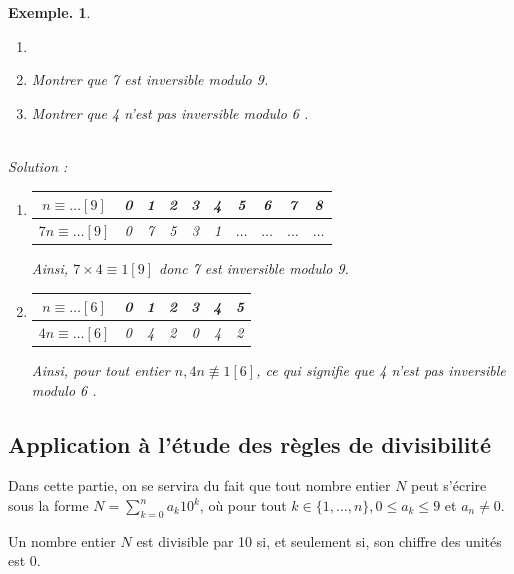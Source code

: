 \documentclass[12pt]{article}
\newcommand{\hide}[1]{#1}
\theoremstyle{break}
\newtheorem*{example}{Exemple.}
\begin{document}
\begin{example}
\begin{enumerate}[noitemsep,topsep=0pt]
    \item[]
    \item Montrer que 7 est inversible modulo 9.
    \item Montrer que 4 n'est pas inversible modulo 6 .
\end{enumerate}
\noindent
~\\Solution :
\begin{enumerate}[noitemsep,topsep=0pt]
    \item
    \begin{tabular}{|c|c|c|c|c|c|c|c|c|c|}
    \hline
    $n \equiv \ldots[9]$ & 0 & 1 & 2 & 3 & 4 & 5 & 6 & 7 & 8 \\
    \hline
    $7 n \equiv \ldots[9]$ & 0 & 7 & 5 & 3 & 1 & $\ldots$ & $\ldots$ & $\ldots$ & $\ldots$ \\
    \hline
    \end{tabular}
    
    Ainsi, $7 \times 4 \equiv 1[9]$ donc 7 est inversible modulo 9.\\
    \item
    \begin{tabular}{|c|c|c|c|c|c|c|}
    \hline
    $n \equiv \ldots[6]$ & 0 & 1 & 2 & 3 & 4 & 5 \\
    \hline
    $4 n \equiv \ldots[6]$ & 0 & 4 & 2 & 0 & 4 & 2 \\
    \hline
    \end{tabular}
    
    Ainsi, pour tout entier $n, 4 n \not \equiv 1[6]$, ce qui signifie que 4 n'est pas inversible modulo 6 .
\end{enumerate}
\end{example}

\subsection{Application à l'étude des règles de divisibilité}\noindent
Dans cette partie, on se servira du fait que tout nombre entier $N$ peut s'écrire sous la forme $N=\sum_{k=0}^{n} a_{k} 10^{k}$, où pour tout $k \in\{1, \ldots, n\}, 0 \leqslant a_{k} \leqslant 9$ et $a_{n} \neq 0$.

\begin{proposition}{}{}
    Un nombre entier $N$ est divisible par 10 si, et seulement si, \hide{son chiffre des unités est 0}.
\end{proposition}
\end{document}
